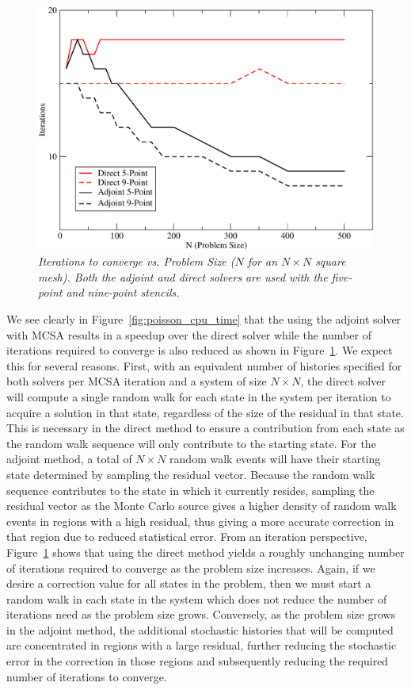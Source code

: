 \documentclass[preprint,12pt]{elsarticle}
\begin{document}
\begin{figure}[ht!]
  \centering
  \includegraphics[width=5in,clip]{dir_adj_iterations.pdf}
  \caption{\sl Iterations to converge vs. Problem Size ($N$ for an $N
    \times N$ square mesh). Both the adjoint and direct solvers are
    used with the five-point and nine-point stencils. }
  \label{fig:poisson_iterations}
\end{figure}

We see clearly in Figure~\ref{fig:poisson_cpu_time} that the using the
adjoint solver with MCSA results in a speedup over the direct solver
while the number of iterations required to converge is also reduced as
shown in Figure~\ref{fig:poisson_iterations}. We expect this for several
reasons. First, with an equivalent number of histories specified for
both solvers per MCSA iteration and a system of size $N \times N$, the
direct solver will compute a single random walk for each state in the
system per iteration to acquire a solution in that state, regardless
of the size of the residual in that state. This is necessary in the
direct method to ensure a contribution from each state as the random
walk sequence will only contribute to the starting state. For the
adjoint method, a total of $N \times N$ random walk events will have
their starting state determined by sampling the residual
vector. Because the random walk sequence contributes to the state in
which it currently resides, sampling the residual vector as the Monte
Carlo source gives a higher density of random walk events in regions
with a high residual, thus giving a more accurate correction in that
region due to reduced statistical error. From an iteration
perspective, Figure~\ref{fig:poisson_iterations} shows that using the
direct method yields a roughly unchanging number of iterations
required to converge as the problem size increases. Again, if we
desire a correction value for all states in the problem, then we must
start a random walk in each state in the system which does not reduce
the number of iterations need as the problem size grows. Conversely,
as the problem size grows in the adjoint method, the additional
stochastic histories that will be computed are concentrated in regions
with a large residual, further reducing the stochastic error in the
correction in those regions and subsequently reducing the required
number of iterations to converge.
\end{document}

